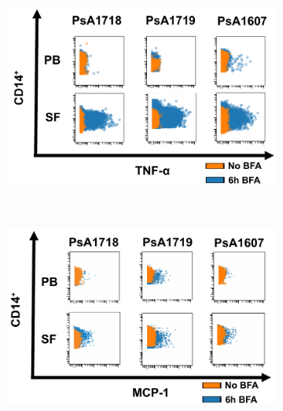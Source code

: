 \bigskip
\begin{figure}[H]
\centering
\begin{subfigure}[b]{0.45\textwidth}
\centering 
\includegraphics[width=\textwidth]{./Results3/pdfs/PSA_0h_6h_BFA_TNFa_mass_cytometry_PSA1718_PSA1719_PSA1607}
\caption{}
\end{subfigure}
~
\begin{subfigure}[b]{0.45\textwidth} 
\centering
\includegraphics[width=\textwidth]{./Results3/pdfs/PSA_0h_6h_BFA_MCP1_mass_cytometry_PSA1718_PSA1719_PSA1607}
\caption{}
\end{subfigure}
\begin{subfigure}[b]{0.45\textwidth} 
\centering

\end{subfigure}
\end{figure}
